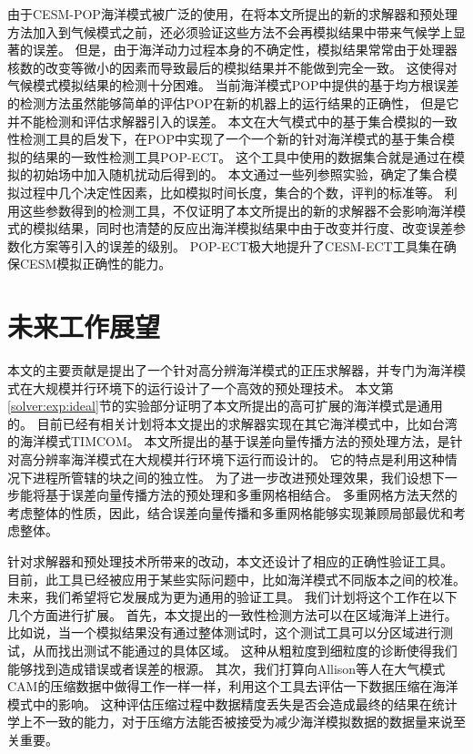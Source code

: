 由于CESM-POP海洋模式被广泛的使用，在将本文所提出的新的求解器和预处理方法加入到气候模式之前，还必须验证这些方法不会再模拟结果中带来气候学上显著的误差。 
但是，由于海洋动力过程本身的不确定性，模拟结果常常由于处理器核数的改变等微小的因素而导致最后的模拟结果并不能做到完全一致。
这使得对气候模式模拟结果的检测十分困难。
当前海洋模式POP中提供的基于均方根误差的检测方法虽然能够简单的评估POP在新的机器上的运行结果的正确性，
但是它并不能检测和评估求解器引入的误差。
本文在大气模式中的基于集合模拟的一致性检测工具的启发下，在POP中实现了一个一个新的针对海洋模式的基于集合模拟的结果的一致性检测工具POP-ECT。
这个工具中使用的数据集合就是通过在模拟的初始场中加入随机扰动后得到的。
本文通过一些列参照实验，确定了集合模拟过程中几个决定性因素，比如模拟时间长度，集合的个数，评判的标准等。
利用这些参数得到的检测工具，不仅证明了本文所提出的新的求解器不会影响海洋模式的模拟结果，同时也清楚的反应出海洋模拟结果中由于改变并行度、改变误差参数化方案等引入的误差的级别。 
POP-ECT极大地提升了CESM-ECT工具集在确保CESM模拟正确性的能力。


 
\section{未来工作展望}
\label{sec:futurework}

本文的主要贡献是提出了一个针对高分辨海洋模式的正压求解器，并专门为海洋模式在大规模并行环境下的运行设计了一个高效的预处理技术。
本文第\ref{solver:exp:ideal}节的实验部分证明了本文所提出的高可扩展的海洋模式是通用的。
目前已经有相关计划将本文提出的求解器实现在其它海洋模式中，比如台湾的海洋模式TIMCOM\cite{tseng2011parallel}。 
本文所提出的基于误差向量传播方法的预处理方法，是针对高分辨率海洋模式在大规模并行环境下运行而设计的。
它的特点是利用这种情况下进程所管辖的块之间的独立性。 为了进一步改进预处理效果，我们设想下一步能将基于误差向量传播方法的预处理和多重网格相结合。 
多重网格方法天然的考虑整体的性质，因此，结合误差向量传播和多重网格能够实现兼顾局部最优和考虑整体。


针对求解器和预处理技术所带来的改动，本文还设计了相应的正确性验证工具。
目前，此工具已经被应用于某些实际问题中，比如海洋模式不同版本之间的校准。
未来，我们希望将它发展成为更为通用的验证工具。 
我们计划将这个工作在以下几个方面进行扩展。 
首先，本文提出的一致性检测方法可以在区域海洋上进行。
比如说，当一个模拟结果没有通过整体测试时，这个测试工具可以分区域进行测试，从而找出测试不能通过的具体区域。 
这种从粗粒度到细粒度的诊断使得我们能够找到造成错误或者误差的根源。 
其次，我们打算向Allison等人在大气模式CAM的压缩数据中做得工作一样\cite{baker2014methodology}一样，利用这个工具去评估一下数据压缩在海洋模式中的影响。
这种评估压缩过程中数据精度丢失是否会造成最终的结果在统计学上不一致的能力，对于压缩方法能否被接受为减少海洋模拟数据的数据量来说至关重要。 



